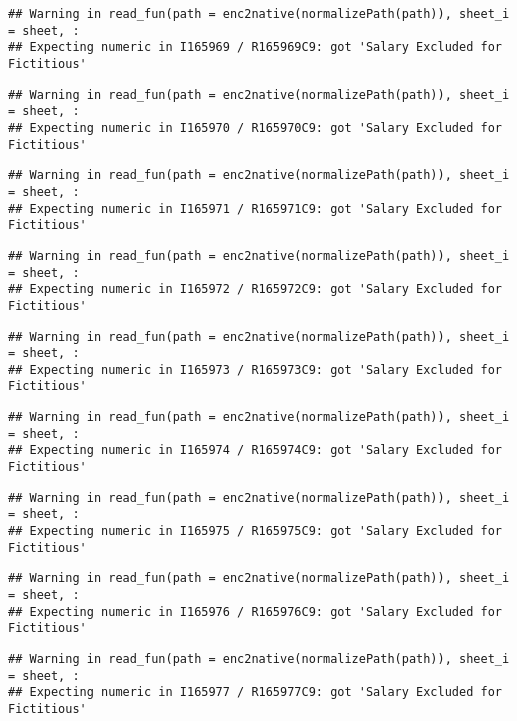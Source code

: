 \documentclass[
]{article}
\begin{document}
\begin{verbatim}
## Warning in read_fun(path = enc2native(normalizePath(path)), sheet_i = sheet, :
## Expecting numeric in I165969 / R165969C9: got 'Salary Excluded for Fictitious'
\end{verbatim}

\begin{verbatim}
## Warning in read_fun(path = enc2native(normalizePath(path)), sheet_i = sheet, :
## Expecting numeric in I165970 / R165970C9: got 'Salary Excluded for Fictitious'
\end{verbatim}

\begin{verbatim}
## Warning in read_fun(path = enc2native(normalizePath(path)), sheet_i = sheet, :
## Expecting numeric in I165971 / R165971C9: got 'Salary Excluded for Fictitious'
\end{verbatim}

\begin{verbatim}
## Warning in read_fun(path = enc2native(normalizePath(path)), sheet_i = sheet, :
## Expecting numeric in I165972 / R165972C9: got 'Salary Excluded for Fictitious'
\end{verbatim}

\begin{verbatim}
## Warning in read_fun(path = enc2native(normalizePath(path)), sheet_i = sheet, :
## Expecting numeric in I165973 / R165973C9: got 'Salary Excluded for Fictitious'
\end{verbatim}

\begin{verbatim}
## Warning in read_fun(path = enc2native(normalizePath(path)), sheet_i = sheet, :
## Expecting numeric in I165974 / R165974C9: got 'Salary Excluded for Fictitious'
\end{verbatim}

\begin{verbatim}
## Warning in read_fun(path = enc2native(normalizePath(path)), sheet_i = sheet, :
## Expecting numeric in I165975 / R165975C9: got 'Salary Excluded for Fictitious'
\end{verbatim}

\begin{verbatim}
## Warning in read_fun(path = enc2native(normalizePath(path)), sheet_i = sheet, :
## Expecting numeric in I165976 / R165976C9: got 'Salary Excluded for Fictitious'
\end{verbatim}

\begin{verbatim}
## Warning in read_fun(path = enc2native(normalizePath(path)), sheet_i = sheet, :
## Expecting numeric in I165977 / R165977C9: got 'Salary Excluded for Fictitious'
\end{verbatim}
\end{document}
